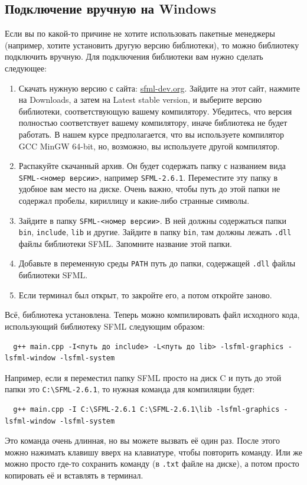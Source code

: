 \documentclass{article}
\begin{document}
\subsection*{Подключение вручную на Windows}
Если вы по какой-то причине не хотите использовать пакетные менеджеры (например, хотите установить другую версию библиотеки), то можно библиотеку подключить вручную. Для подключения библиотеки вам нужно сделать следующее:

\begin{enumerate}
\item Скачать нужную версию с сайта: \href{https://www.sfml-dev.org/}{sfml-dev.org}. Зайдите на этот сайт, нажмите на Downloads, а затем на Latest stable version, и выберите версию библиотеки, соответствующую вашему компилятору. Убедитесь, что версия полностью соответствует вашему компилятору, иначе библиотека не будет работать. В нашем курсе предполагается, что вы используете компилятор GCC MinGW 64-bit, но, возможно, вы используете другой компилятор.

\item Распакуйте скачанный архив. Он будет содержать папку с названием вида \texttt{SFML-<номер версии>}, например \texttt{SFML-2.6.1}. Переместите эту папку в удобное вам место на диске. Очень важно, чтобы путь до этой папки не содержал пробелы, кириллицу и какие-либо странные символы.

\item Зайдите в папку \texttt{SFML-<номер версии>}. В ней должны содержаться папки \texttt{bin}, \texttt{include}, \texttt{lib} и другие. Зайдите в папку \texttt{bin}, там должны лежать \texttt{.dll} файлы библиотеки SFML. Запомните название этой папки.

\item Добавьте в переменную среды \texttt{PATH} путь до папки, содержащей \texttt{.dll} файлы библиотеки SFML.

\item Если терминал был открыт, то закройте его, а потом откройте заново.
\end{enumerate}
Всё, библиотека установлена. Теперь можно компилировать файл исходного кода, использующий библиотеку SFML следующим образом:
\begin{verbatim}
  g++ main.cpp -I<путь до include> -L<путь до lib> -lsfml-graphics -lsfml-window -lsfml-system
\end{verbatim}
Например, если я переместил папку SFML просто на диск C и путь до этой папки это \texttt{C:\textbackslash SFML-2.6.1}, то нужная команда для компиляции будет:
\begin{verbatim}
  g++ main.cpp -I C:\SFML-2.6.1 C:\SFML-2.6.1\lib -lsfml-graphics -lsfml-window -lsfml-system
\end{verbatim}
Это команда очень длинная, но вы можете вызвать её один раз. После этого можно нажимать клавишу вверх на клавиатуре, чтобы повторить команду. Или же можно просто где-то сохранить команду (в \texttt{.txt} файле на диске), а потом просто копировать её и вставлять в терминал.
\end{document}
